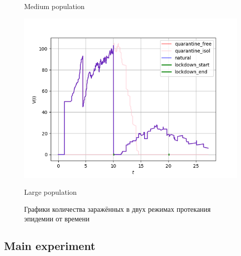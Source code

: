 \begin{figure}[h]
\begin{minipage}{0.49\linewidth}
			\centering
			Medium population
		\end{minipage}
		\begin{center}
			\begin{minipage}{0.5\linewidth}
			\includegraphics[width=\linewidth, keepaspectratio]{../figs/basic_experiment_big_population}
			
			\centering
			Large population
		\end{minipage}
		\end{center}
		\caption{Графики количества заражённых в двух режимах протекания эпидемии от времени}\label{pic:basic}
	\end{figure}

	\subsection*{Main experiment}
	
	
	
	\printbibliography
	
